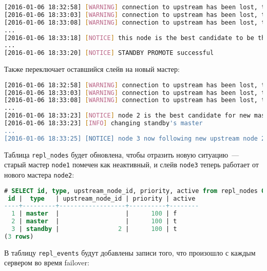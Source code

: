 \begin{lstlisting}[language=Bash,label=lst:repmgr6,caption=Переключение слейва в мастер]
[2016-01-06 18:32:58] [WARNING] connection to upstream has been lost, trying to recover... 15 seconds before failover decision
[2016-01-06 18:33:03] [WARNING] connection to upstream has been lost, trying to recover... 10 seconds before failover decision
[2016-01-06 18:33:08] [WARNING] connection to upstream has been lost, trying to recover... 5 seconds before failover decision
...
[2016-01-06 18:33:18] [NOTICE] this node is the best candidate to be the new master, promoting...
...
[2016-01-06 18:33:20] [NOTICE] STANDBY PROMOTE successful
\end{lstlisting}

Также переключает оставшийся слейв на новый мастер:

\begin{lstlisting}[language=Bash,label=lst:repmgr7,caption=Переключение слейва на новый мастер]
[2016-01-06 18:32:58] [WARNING] connection to upstream has been lost, trying to recover... 15 seconds before failover decision
[2016-01-06 18:33:03] [WARNING] connection to upstream has been lost, trying to recover... 10 seconds before failover decision
[2016-01-06 18:33:08] [WARNING] connection to upstream has been lost, trying to recover... 5 seconds before failover decision
...
[2016-01-06 18:33:23] [NOTICE] node 2 is the best candidate for new master, attempting to follow...
[2016-01-06 18:33:23] [INFO] changing standby's master
...
[2016-01-06 18:33:25] [NOTICE] node 3 now following new upstream node 2
\end{lstlisting}

Таблица \lstinline!repl_nodes! будет обновлена, чтобы отразить новую ситуацию~--- старый мастер \lstinline!node1! помечен как неактивный, и слейв \lstinline!node3! теперь работает от нового мастера \lstinline!node2!:

\begin{lstlisting}[language=SQL,label=lst:repmgr8,caption=Результат после failover]
# SELECT id, type, upstream_node_id, priority, active from repl_nodes ORDER BY id;
 id |  type   | upstream_node_id | priority | active
----+---------+------------------+----------+--------
  1 | master  |                  |      100 | f
  2 | master  |                  |      100 | t
  3 | standby |                2 |      100 | t
(3 rows)
\end{lstlisting}

В таблицу \lstinline!repl_events! будут добавлены записи того, что произошло с каждым сервером во время failover:

